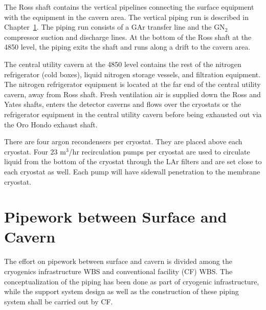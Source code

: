 The Ross shaft contains the vertical pipelines connecting the 
surface equipment with the equipment in the cavern area. The 
vertical piping run is described in 
Chapter~\ref{sec:cryo-cryosys-pipework-surface-cav}. 
The piping run consists of a GAr transfer line and the 
GN$_2$ compressor suction and discharge lines. At the bottom of 
the Ross shaft at the 4850 level, the piping exits the 
shaft and runs along a drift to the cavern area.

The central utility cavern at the 4850 level contains the
rest of the nitrogen refrigerator (cold boxes), liquid
nitrogen storage vessels, and filtration equipment.
The nitrogen refrigerator equipment is located at the far
end of the central utility cavern, away from Ross shaft.
Fresh ventilation air is supplied down the Ross and Yates shafts, 
enters the detector caverns and flows over the cryostats 
or the refrigerator equipment in the central utility 
cavern before being exhausted out via the Oro Hondo
exhaust shaft.

There are four argon recondensers per cryostat. They are 
placed above each cryostat. Four 23 m$^3$/hr recirculation 
pumps per cryostat are used to circulate liquid from the bottom 
of the cryostat through the LAr filters and are set close to 
each cryostat as well. Each pump will have sidewall
penetration to the membrane cryostat. 


\chapter{Pipework between Surface and Cavern}
\label{sec:cryo-cryosys-pipework-surface-cav}

The effort on pipework between surface and cavern is divided among the
cryogenics infrastructure WBS and conventional facility (CF) WBS. The
conceptualization of the piping has been done as part of cryogenic
infrastructure, while the support system design as well as the
construction of these piping system shall be carried out by CF.

